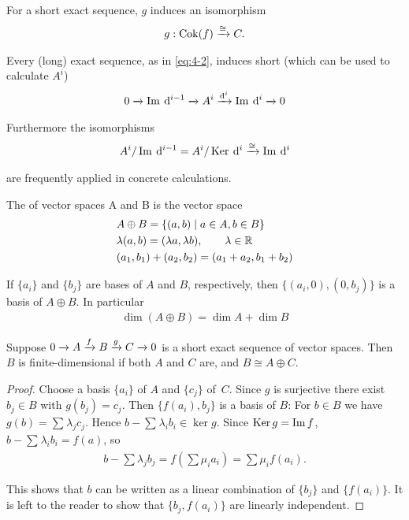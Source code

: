 For a short exact sequence, $g$ induces an isomorphism
\begin{align*}
  g:\cok(f) \xra[\cong] C.
\end{align*}

Every (long) exact sequence, as in \eqref{eq:4-2}, induces short  (which can
be used to calculate $A^i$)
\begin{align*}
  0\xra[] \im\dd^{i-1} \xra[] A^i \xra[\dd^i] \im\dd^i \xra[] 0
\end{align*}

Furthermore the isomorphisms
\begin{align*}
  A^i/\im\dd^{i-1} = A^i/\ker\dd^i \xra[\cong] \im\dd^i
\end{align*}

are frequently applied in concrete calculations.

The  of vector spaces A and B is the vector space
\begin{align*}
  & A\oplus B  = \{(a,b) \mid a\in A, b\in B\}                       \\
  & \lambda(a, b)  = (\lambda a, \lambda b), \qquad \lambda\in{\ensuremath{\mathbb{R}}} \\
  & (a_1, b_1) + (a_2, b_2)  = (a_1 + a_2, b_1 + b_2)
\end{align*}

If $\{a_i\}$ and $\{b_j\}$ are bases of $A$ and $B$, respectively, then $\{(a_i, 0), (0, b_j)\}$ is a
basis of $A\oplus B$. In particular
\begin{align*}
  \dim(A\oplus B) = \dim A + \dim B
\end{align*}

\begin{lemma}\label{lemma:4-1}
  Suppose $0\xra[]A\xra[f]B\xra[g]C\xra[]0$ is a short exact sequence of vector
  spaces. Then $B$ is finite-dimensional if both $A$ and $C$ are, and $B\cong A\oplus C$.
\end{lemma}

\begin{proof}
  Choose a basis $\{a_i\}$ of $A$ and $\{c_j\}$ of\, $C$. Since $g$ is surjective there
  exist $b_j\in B$ with $g(b_j) = c_j$. Then $\{f(a_i), b_j\}$ is a basis of $B$: For $b\in B$
  we have $g(b) = \sum_{}^{}{\lambda_jc_j}$. Hence $b - \sum_{}^{}{\lambda_ib_i}\in\ker g$. Since
  $\operatorname{Ker} g= \operatorname{Im} f$, $b - \sum_{}^{}{\lambda_ib_i} = f(a)$, so
  \begin{align*}
    b-\sum\lambda_jb_j=f\left(\sum\mu_ia_i\right)=\sum\mu_if(a_i).
  \end{align*}

  This shows that $b$ can be written as a linear combination of $\{b_j\}$ and $\{f(a_i)\}$. It
  is left to the reader to show that $\{b_j, f(a_i)\}$ are linearly independent.
\end{proof}

